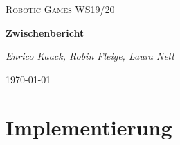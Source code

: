 \documentclass[12pt, a4paper]{report}
\begin{document}
\begin{titlepage}

        \centering
        \vspace{1cm}
        {\scshape\Large Robotic Games WS19/20 \par}
        \vspace{1.5cm}
        {\huge\bfseries Zwischenbericht \par}
        \vspace{2cm}
        {\Large\itshape Enrico Kaack, Robin Fleige, Laura Nell \par}

    
        \vfill
    
        {\large \today\par}
    \end{titlepage}
\newpage    

\onehalfspacing


\chapter{Implementierung}
\end{document}
